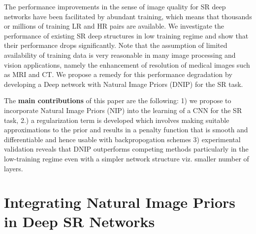 \documentclass[9pt]{article}
\begin{document}
 The performance improvements in the sense of image quality for SR deep networks have been facilitated by abundant training, which means that thousands or millions of training LR and HR pairs are available. We investigate the performance of existing SR deep structures in low training regime and show that their performance drops significantly.  Note that the assumption of limited availability of training data is very reasonable in many image processing and vision applications, namely the enhancement of resolution of medical images such as MRI and CT. We propose a remedy for this performance degradation by developing a Deep network with Natural Image Priors (DNIP) for the SR task.

The \textbf{main contributions} of this paper are the following: 1)  we propose to incorporate Natural Image Priors (NIP) \cite{kim2010single,tappen2003exploiting} into the learning of a CNN for the SR task,  2.) a regularization term is developed which involves making suitable approximations to the prior and results in a penalty function that is smooth and differentiable and hence usable with backpropogation schemes 3) experimental validation reveals that DNIP outperforms competing methods particularly in the low-training regime even with a simpler network structure viz. smaller number of layers.





\vspace{-5mm}
\section{Integrating Natural Image Priors in Deep SR Networks}
\label{sec:img_priors}
\end{document}
